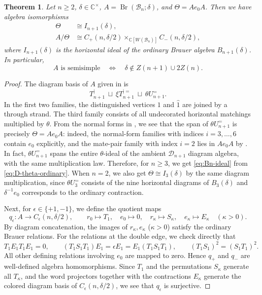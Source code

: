 \documentclass[11pt,a4paper]{amsart}
\newtheorem{theorem}{Theorem}[section]
\theoremstyle{uprightdefinition}
\theoremstyle{remark}\newtheorem{remark}[theorem]{Remark}
\begin{document}
\begin{theorem}\label{thm:Bn-fiber}
Let $n\ge2$, $\delta\in\mathbb C^\times$, $A=\operatorname{Br}(\mathscr{B}_n;\delta)$, and
$\Theta=Ae_0A$. Then we have algebra isomorphisms
\begin{align}
 \Theta&\cong I_{n+1}(\delta),\label{eq:Bn-ideal}\\
 A/\Theta&\cong C_+(n,\delta/2)
       \mathop{\times}_{\mathbb C[W(\mathscr{B}_n)]}C_-(n,\delta/2),
       \label{eq:Bn-fiber}
\end{align}
where $I_{n+1}(\delta)$ is the horizontal ideal of the ordinary Brauer
algebra $B_{n+1}(\delta)$. In particular,
\[
 A\text{ is semisimple}\quad\Longleftrightarrow\quad
 \delta\notin Z(n+1)\cup2Z(n).
\]
\end{theorem}
\begin{proof}
The diagram basis of $A$ given in
\cite[Notation~3.3 and Theorem~3.6]{CohenLiu2014} is
\[
 T_{n+1}^{|}\ \sqcup\ \xi T_{n+1}^{|=}
       \ \sqcup\ \theta U_{n+1}^{=}.
\]
In the first two families, the distinguished vertices $1$ and $\widehat1$ are
joined by a through strand. The third family consists of all undecorated
horizontal matchings multiplied by $\theta$. From the normal forms in
\cite[Notation~4.7, Table~1, and Theorem~5.7]{CohenLiu2014}, we see that the span of $\theta U_{n+1}^{=}$ is precisely $\Theta=Ae_0A$:
indeed, the normal-form families with indices $i=3,\ldots,6$ contain $e_0$
explicitly, and the mate-pair family with index $i=2$ lies in $Ae_0A$ by \cite[Lemma~4.5, equation~(4.4)]{CohenLiu2014}.
In fact, $\theta U_{n+1}^{=}$ spans the entire $\theta$-ideal
of the ambient $\mathscr{D}_{n+1}$ diagram algebra, with the same multiplication law.
Therefore, for $n\ge3$, we get \eqref{eq:Bn-ideal} from \eqref{eq:D-theta-ordinary}. When $n=2$, we also get $\Theta\cong I_3(\delta)$ by the same diagram multiplication, since
$\theta U_3^{=}$ consists of the nine horizontal diagrams of $B_3(\delta)$ and
$\delta^{-1}e_0$ corresponds to the ordinary contraction.

Next, for $\epsilon\in\{+1,-1\}$, we define the quotient maps
\[
 q_\epsilon:A\longrightarrow C_\epsilon(n,\delta/2),\qquad
 r_0\longmapsto T_1,\quad e_0\longmapsto0,\quad
 r_{\kappa}\longmapsto S_{\kappa},\quad e_{\kappa}\longmapsto E_{\kappa}\quad(\kappa>0).
\]
By diagram concatenation, the images of $r_\kappa,e_\kappa$ ($\kappa>0$) satisfy the ordinary Brauer relations. For the relations at the
double edge, we check directly that
\[
 T_1E_1T_1E_1=0,
 \qquad (T_1S_1T_1)E_1=\epsilon E_1
                   =E_1(T_1S_1T_1),
 \qquad (T_1S_1)^2=(S_1T_1)^2.
\]
All other defining relations involving $e_0$ are mapped to zero. Hence $q_+$ and $q_-$ are well-defined algebra
homomorphisms. Since $T_1$ and the permutations $S_\kappa$
generate all $T_{\kappa}$, and the word projectors together with the contractions $E_\kappa$ generate
the colored diagram basis of $C_\epsilon(n,\delta/2)$, we see that $q_\epsilon$ is surjective.


\end{proof}
\end{document}
